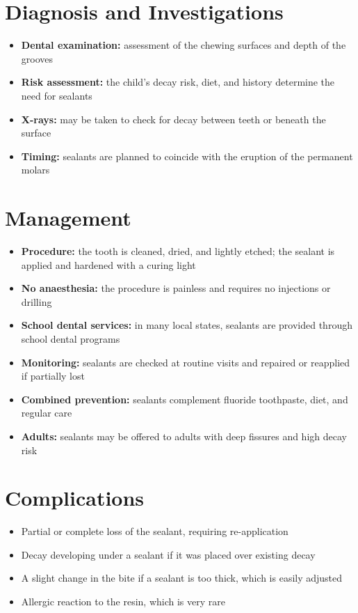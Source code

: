 \section*{Diagnosis and Investigations}
\begin{itemize}
    \item \textbf{Dental examination:} assessment of the chewing surfaces and depth of the grooves
    \item \textbf{Risk assessment:} the child's decay risk, diet, and history determine the need for sealants
    \item \textbf{X-rays:} may be taken to check for decay between teeth or beneath the surface
    \item \textbf{Timing:} sealants are planned to coincide with the eruption of the permanent molars
\end{itemize}

\section*{Management}
\begin{itemize}
    \item \textbf{Procedure:} the tooth is cleaned, dried, and lightly etched; the sealant is applied and hardened with a curing light
    \item \textbf{No anaesthesia:} the procedure is painless and requires no injections or drilling
    \item \textbf{School dental services:} in many local states, sealants are provided through school dental programs
    \item \textbf{Monitoring:} sealants are checked at routine visits and repaired or reapplied if partially lost
    \item \textbf{Combined prevention:} sealants complement fluoride toothpaste, diet, and regular care
    \item \textbf{Adults:} sealants may be offered to adults with deep fissures and high decay risk
\end{itemize}

\section*{Complications}
\begin{itemize}
    \item Partial or complete loss of the sealant, requiring re-application
    \item Decay developing under a sealant if it was placed over existing decay
    \item A slight change in the bite if a sealant is too thick, which is easily adjusted
    \item Allergic reaction to the resin, which is very rare
\end{itemize}

